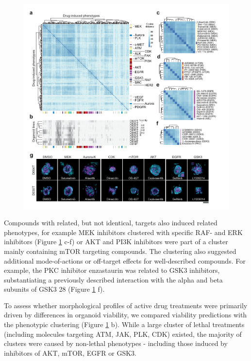 \begin{flushleft}
\begin{figure}[h!]
\centering
\includegraphics[width=\textwidth,
                height=\textheight,
                keepaspectratio]{figures/promise/pdf/fig_3_1.pdf}
\caption{}
\label{fig_231}
\end{figure}
\bigbreak

Compounds with related, but not identical, targets also induced related phenotypes, for example MEK inhibitors clustered with specific RAF- and ERK inhibitors (Figure \ref{fig_231} c-f) or AKT and PI3K inhibitors were part of a cluster mainly containing mTOR targeting compounds. The clustering also suggested additional mode-of-actions or off-target effects for well-described compounds. For example, the PKC inhibitor enzastaurin was related to GSK3 inhibitors, substantiating a previously described interaction with the alpha and beta subunits of GSK3 28 (Figure \ref{fig_231} f). 

\bigbreak
To assess whether morphological profiles of active drug treatments were primarily driven by differences in organoid viability, we compared viability predictions with the phenotypic clustering (Figure \ref{fig_231} b). While a large cluster of lethal treatments (including molecules targeting ATM, JAK, PLK, CDK) existed, the majority of clusters were caused by non-lethal phenotypes - including those induced by inhibitors of AKT, mTOR, EGFR or GSK3.


\end{flushleft}
